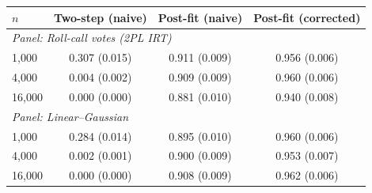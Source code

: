 \begin{tabular}{lccc}
\toprule
$n$ & Two-step (naive) & Post-fit (naive) & Post-fit (corrected) \\
\midrule
\multicolumn{4}{l}{\emph{Panel: Roll-call votes (2PL IRT)}} \\
1,000 & 0.307 (0.015) & 0.911 (0.009) & 0.956 (0.006) \\
4,000 & 0.004 (0.002) & 0.909 (0.009) & 0.960 (0.006) \\
16,000 & 0.000 (0.000) & 0.881 (0.010) & 0.940 (0.008) \\
\midrule
\multicolumn{4}{l}{\emph{Panel: Linear--Gaussian}} \\
1,000 & 0.284 (0.014) & 0.895 (0.010) & 0.960 (0.006) \\
4,000 & 0.002 (0.001) & 0.900 (0.009) & 0.953 (0.007) \\
16,000 & 0.000 (0.000) & 0.908 (0.009) & 0.962 (0.006) \\
\bottomrule
\end{tabular}
